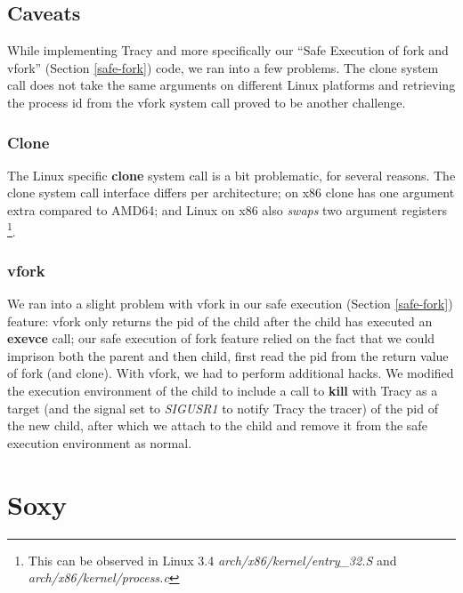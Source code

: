 \documentclass[a4paper, 10pt]{report}
\begin{document}
\section{Caveats}

While implementing Tracy and more specifically our ``Safe Execution of fork
and vfork'' (Section \ref{safe-fork}) code, we ran into a few problems. The
clone system call does not take the same arguments on different Linux
platforms and retrieving the process id from the vfork system call proved to be
another challenge.

\subsection{Clone}

The Linux specific \textbf{clone} system call is a bit problematic, for
several reasons. The clone system call interface differs per architecture;
on x86 clone has one argument extra compared to AMD64; and Linux on x86
also \textit{swaps} two argument registers
\footnote{This can be observed in Linux 3.4 \textit{arch/x86/kernel/entry\_32.S}
and \textit{arch/x86/kernel/process.c}}.


\subsection{vfork}

We ran into a slight problem with vfork in our safe execution (Section
\ref{safe-fork}) feature: vfork only returns the pid of the child after the
child has executed an \textbf{exevce} call; our safe execution of fork feature
relied on the fact that we could imprison both the parent and then child, first
read the pid from the return value of fork (and clone). With vfork, we had to
perform additional hacks. We modified the execution environment of the child
to include a call to \textbf{kill} with Tracy as a target (and the signal set to
\textit{SIGUSR1} to notify Tracy the tracer) of the pid of the new child,
after which we attach to the child and remove it from the safe execution
environment as normal.

\chapter{Soxy}
\end{document}

